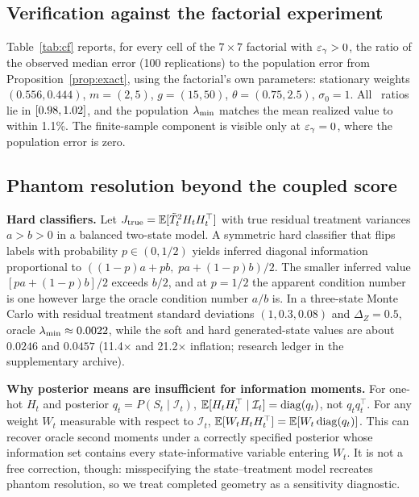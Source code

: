 \subsection{Verification against the factorial experiment}
\label{app:factorial_cf}
Table~\ref{tab:cf} reports, for every cell of the $7\times7$ factorial with $\varepsilon_\gamma>0$, the ratio of the observed median error (100 replications) to the population error from Proposition~\ref{prop:exact}, using the factorial's own parameters: stationary weights $(0.556,0.444)$, $m=(2,5)$, $g=(15,50)$, $\theta=(0.75,2.5)$, $\sigma_0=1$. All \CFNCells\ ratios lie in $[0.98,1.02]$, and the population $\lambda_{\min}$ matches the mean realized value to within 1.1\%. The finite-sample component is visible only at $\varepsilon_\gamma=0$, where the population error is zero.
\begin{table}[h]
\centering\footnotesize
\caption{Observed median error divided by the exact population error (Proposition~\ref{prop:exact}), factorial design.}
\label{tab:cf}

\end{table}

\subsection{Phantom resolution beyond the coupled score}
\label{app:phantom_more}
\textbf{Hard classifiers.} Let $J_{\rm true}=\mathbb{E}[\tilde T_t^2H_tH_t^\top]$ with true residual treatment variances $a>b>0$ in a balanced two-state model. A symmetric hard classifier that flips labels with probability $p\in(0,1/2)$ yields inferred diagonal information proportional to $((1-p)a+pb,\;pa+(1-p)b)/2$. The smaller inferred value $[pa+(1-p)b]/2$ exceeds $b/2$, and at $p=1/2$ the apparent condition number is one however large the oracle condition number $a/b$ is. In a three-state Monte Carlo with residual treatment standard deviations $(1,0.3,0.08)$ and $\Delta_Z=0.5$, oracle $\lambda_{\min}\approx0.0022$, while the soft and hard generated-state values are about $0.0246$ and $0.0457$ (11.4$\times$ and 21.2$\times$ inflation; research ledger in the supplementary archive).

\textbf{Why posterior means are insufficient for information moments.} For one-hot $H_t$ and posterior $q_t=P(S_t\mid\mathcal I_t)$, $\mathbb{E}[H_tH_t^\top\mid\mathcal I_t]=\operatorname{diag}(q_t)$, not $q_tq_t^\top$. For any weight $W_t$ measurable with respect to $\mathcal I_t$, $\mathbb{E}[W_tH_tH_t^\top]=\mathbb{E}[W_t\operatorname{diag}(q_t)]$. This can recover oracle second moments under a correctly specified posterior whose information set contains every state-informative variable entering $W_t$. It is not a free correction, though: misspecifying the state--treatment model recreates phantom resolution, so we treat completed geometry as a sensitivity diagnostic.

